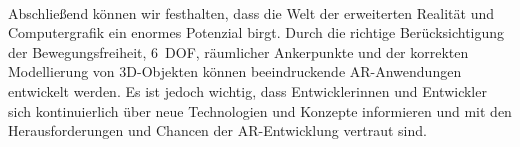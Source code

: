 
\paragraph*{}
    Abschließend können wir festhalten, dass die Welt der erweiterten Realität und Computergrafik ein enormes Potenzial birgt.
    Durch die richtige Berücksichtigung der Bewegungsfreiheit, 6~DOF, räumlicher Ankerpunkte und der korrekten Modellierung von 3D-Objekten können beeindruckende AR-Anwendungen entwickelt werden.
    Es ist jedoch wichtig, dass Entwicklerinnen und Entwickler sich kontinuierlich über neue Technologien und Konzepte informieren und mit den Herausforderungen und Chancen der AR-Entwicklung vertraut sind.
